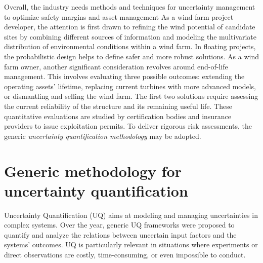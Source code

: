 
Overall, the industry needs methods and techniques for uncertainty management to optimize safety margins and asset management
As a wind farm project developer, the attention is first drawn to refining the wind potential of candidate sites by combining different sources of information and 
modeling the multivariate distribution of environmental conditions within a wind farm. 
In floating projects, the probabilistic design helps to define safer and more robust solutions. 
As a wind farm owner, another significant consideration revolves around end-of-life management. 
This involves evaluating three possible outcomes: extending the operating assets' lifetime, replacing current turbines with more advanced models, or dismantling and selling the wind farm. 
The first two solutions require assessing the current reliability of the structure and its remaining useful life. 
These quantitative evaluations are studied by certification bodies and insurance providers to issue exploitation permits.
To deliver rigorous risk assessments, the generic \textit{uncertainty quantification methodology} may be adopted.

\section*{Generic methodology for uncertainty quantification}

Uncertainty Quantification (\acrshort{UQ}) aims at modeling and managing uncertainties in complex systems.
Over the year, generic UQ frameworks were proposed \citep{rocquigny_2008} to quantify and analyze the relations between uncertain input factors and the systems' outcomes. 
UQ is particularly relevant in situations where experiments or direct observations are costly, time-consuming, or even impossible to conduct.

